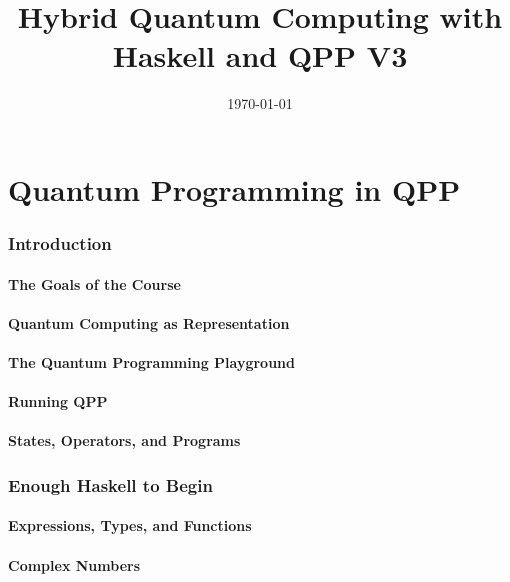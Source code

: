 \documentclass[11pt,a4paper]{article}
\title{Hybrid Quantum Computing with Haskell and QPP V3}
\author{}
\date{\today}
\begin{document}
\maketitle

\tableofcontents

\part{Quantum Programming in QPP}

\section{Introduction}

\subsection{The Goals of the Course}

\subsection{Quantum Computing as Representation}

\subsection{The Quantum Programming Playground}

\subsection{Running QPP}

\subsection{States, Operators, and Programs}


\section{Enough Haskell to Begin}

\subsection{Expressions, Types, and Functions}

\subsection{Complex Numbers}
\end{document}
